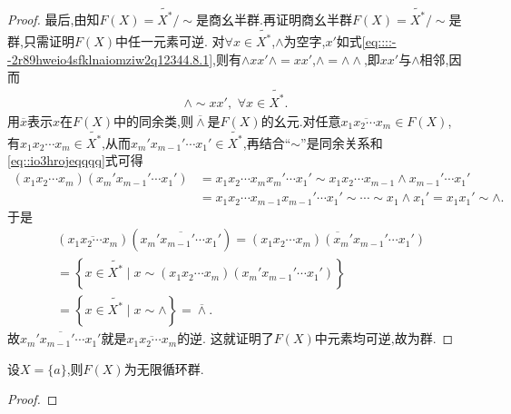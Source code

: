 \documentclass[../../main.tex]{subfiles}%
\begin{document}
\begin{proof}
最后,由知$F(X)=\widetilde{X^*}/\sim$是商幺半群.再证明商幺半群$F(X)=\widetilde{X^*}/\sim$是群,只需证明$F(X)$中任一元素可逆. 对$\forall x\in \widetilde{X^*}$,$\land$为空字,$x'$如式\eqref{eq::::--2r89hweio4sfklnaiomziw2q12344.8.1},则有$\land xx'\land=xx'$,$\land=\land\land$,即$xx'$与$\land$相邻,因而
\begin{align}\label{eq::io3hrojeqqqq}
\land\sim xx',\,\,\forall x\in \widetilde{X^*}.
\end{align}
用$\overline{x}$表示$x$在$F(X)$中的同余类,则$\overline{\land}$是$F(X)$的幺元.对任意$\overline{x_1x_2\cdots x_m}\in F\left( X \right)$,
有$x_1x_2\cdots x_m\in \widetilde{X^*}$,从而$x_m' x_{m-1}' \cdots x_1'\in \widetilde{X^*}$,再结合“$\sim$”是同余关系和\eqref{eq::io3hrojeqqqq}式可得
\begin{align*}
(x_1x_2\cdots x_m)(x_m' x_{m-1}' \cdots x_1' )&=x_1x_2\cdots x_mx_m' \cdots x_1' \sim x_1x_2\cdots x_{m-1}\land x_{m-1}' \cdots x_1' \\
&=x_1x_2\cdots x_{m-1}x_{m-1}' \cdots x_1' \sim \cdots \sim x_1\land x_1' =x_1x_1' \sim \land.
\end{align*}
于是
\begin{align*}
&\left( \overline{x_1x_2\cdots x_m} \right) \left( \overline{x_m' x_{m-1}' \cdots x_1' } \right) =\overline{\left( x_1x_2\cdots x_m \right) \left( x_m' x_{m-1}' \cdots x_1' \right) }
\\
&=\left\{ x\in \widetilde{X^*}\mid x\sim \left( x_1x_2\cdots x_m \right) \left( x_m' x_{m-1}' \cdots x_1' \right) \right\} 
\\
&=\left\{ x\in \widetilde{X^*}\mid x\sim \land \right\} =\overline{\land }.
\end{align*}
故$\overline{x_m' x_{m-1}' \cdots x_1' }$就是$\overline{x_1x_2\cdots x_m}$的逆.
这就证明了$F(X)$中元素均可逆,故为群.


\end{proof}


\begin{proposition}\label{proposition:单元素集的自由群必是无限循环群}
设$X=\{a\}$,则$F(X)$为无限循环群.
\end{proposition}
\begin{proof}



\end{proof}
\end{document}
